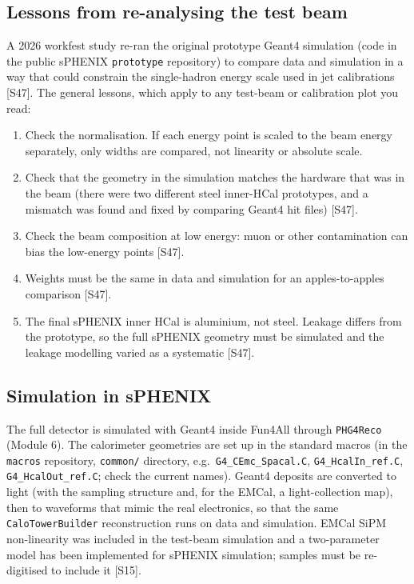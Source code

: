 \documentclass[11pt,letterpaper]{article}
\newcommand{\code}[1]{\texttt{#1}}
\begin{document}
\subsection{Lessons from re-analysing the test beam}
A 2026 workfest study re-ran the original prototype Geant4 simulation (code in the public sPHENIX \code{prototype} repository) to compare data and simulation in a way that could constrain the single-hadron energy scale used in jet calibrations [S47].
The general lessons, which apply to any test-beam or calibration plot you read:
\begin{enumerate}
\item Check the normalisation. If each energy point is scaled to the beam energy separately, only widths are compared, not linearity or absolute scale.
\item Check that the geometry in the simulation matches the hardware that was in the beam (there were two different steel inner-HCal prototypes, and a mismatch was found and fixed by comparing Geant4 hit files) [S47].
\item Check the beam composition at low energy: muon or other contamination can bias the low-energy points [S47].
\item Weights must be the same in data and simulation for an apples-to-apples comparison [S47].
\item The final sPHENIX inner HCal is aluminium, not steel. Leakage differs from the prototype, so the full sPHENIX geometry must be simulated and the leakage modelling varied as a systematic [S47].
\end{enumerate}

\subsection{Simulation in sPHENIX}
The full detector is simulated with Geant4 inside Fun4All through \code{PHG4Reco} (Module 6).
The calorimeter geometries are set up in the standard macros (in the \code{macros} repository, \code{common/} directory, e.g.\ \code{G4\_CEmc\_Spacal.C}, \code{G4\_HcalIn\_ref.C}, \code{G4\_HcalOut\_ref.C}; check the current names).
Geant4 deposits are converted to light (with the sampling structure and, for the EMCal, a light-collection map), then to waveforms that mimic the real electronics, so that the same \code{CaloTowerBuilder} reconstruction runs on data and simulation.
EMCal SiPM non-linearity was included in the test-beam simulation and a two-parameter model has been implemented for sPHENIX simulation; samples must be re-digitised to include it [S15].
\end{document}
